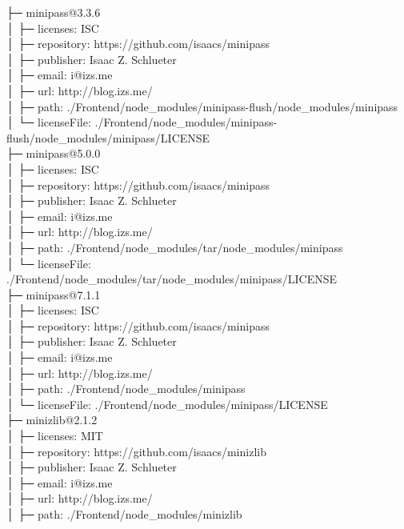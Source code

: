 \documentclass[
    paper=a4,
    twoside=false,
    parskip=half,
    listof=entryprefix,
    listof=totoc,
    index=totoc,
    bibliography=totoc,
    headsepline,
]{scrbook}
\begin{document}
    ├─ minipass@3.3.6\\
    │  ├─ licenses: ISC\\
    │  ├─ repository: https://github.com/isaacs/minipass\\
    │  ├─ publisher: Isaac Z. Schlueter\\
    │  ├─ email: i@izs.me\\
    │  ├─ url: http://blog.izs.me/\\
    │  ├─ path: ./Frontend/node\_modules/minipass-flush/node\_modules/minipass\\
    │  └─ licenseFile: ./Frontend/node\_modules/minipass-flush/node\_modules/minipass/LICENSE\\
    ├─ minipass@5.0.0\\
    │  ├─ licenses: ISC\\
    │  ├─ repository: https://github.com/isaacs/minipass\\
    │  ├─ publisher: Isaac Z. Schlueter\\
    │  ├─ email: i@izs.me\\
    │  ├─ url: http://blog.izs.me/\\
    │  ├─ path: ./Frontend/node\_modules/tar/node\_modules/minipass\\
    │  └─ licenseFile: ./Frontend/node\_modules/tar/node\_modules/minipass/LICENSE\\
    ├─ minipass@7.1.1\\
    │  ├─ licenses: ISC\\
    │  ├─ repository: https://github.com/isaacs/minipass\\
    │  ├─ publisher: Isaac Z. Schlueter\\
    │  ├─ email: i@izs.me\\
    │  ├─ url: http://blog.izs.me/\\
    │  ├─ path: ./Frontend/node\_modules/minipass\\
    │  └─ licenseFile: ./Frontend/node\_modules/minipass/LICENSE\\
    ├─ minizlib@2.1.2\\
    │  ├─ licenses: MIT\\
    │  ├─ repository: https://github.com/isaacs/minizlib\\
    │  ├─ publisher: Isaac Z. Schlueter\\
    │  ├─ email: i@izs.me\\
    │  ├─ url: http://blog.izs.me/\\
    │  ├─ path: ./Frontend/node\_modules/minizlib\\
\end{document}
